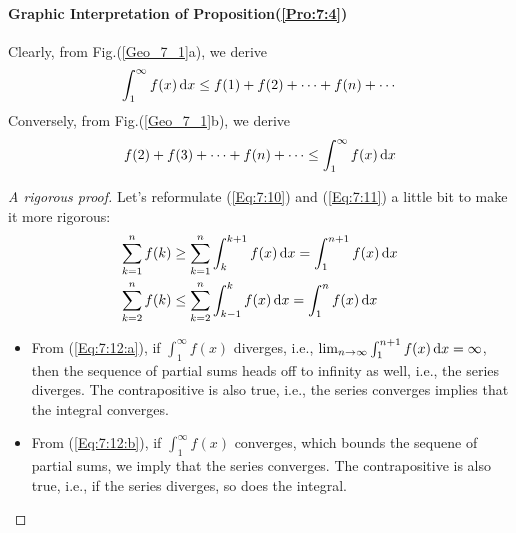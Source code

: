 \paragraph{Graphic Interpretation of Proposition(\ref{Pro:7:4})}
Clearly, from Fig.(\ref{Geo_7_1}a), we derive
\begin{equation}\label{Eq:7:10}
\int_1^\infty f(x)\diff x\le f(1)+f(2)+\cdots+f(n)+\cdots
\end{equation}
Conversely, from Fig.(\ref{Geo_7_1}b), we derive
\begin{equation}\label{Eq:7:11}
f(2)+f(3)+\cdots+f(n)+\cdots\le\int_1^\infty f(x)\diff x
\end{equation}
\begin{proof}[A rigorous proof]
Let's reformulate (\ref{Eq:7:10}) and (\ref{Eq:7:11}) a little bit to make it more rigorous:
\begin{subequations}
\begin{align}
\sum_{k=1}^nf(k)&\ge\sum_{k=1}^n\int_k^{k+1}f(x)\diff x=\int_1^{n+1}f(x)\diff x\label{Eq:7:12:a}\\
\sum_{k=2}^nf(k)&\le \sum_{k=2}^n\int_{k-1}^{k}f(x)\diff x
=
\int_1^nf(x)\diff x\label{Eq:7:12:b}
\end{align}
\end{subequations}
\begin{itemize}
\item
From (\ref{Eq:7:12:a}), if $\int_1^\infty f(x)$ diverges, i.e., $\lim_{n\to\infty}\int_1^{n+1}f(x)\,\mathrm{d} x=\infty$, then the sequence of partial sums heads off to infinity as well, i.e., the series diverges. The contrapositive is also true, i.e., the series converges implies that the integral converges.
\item
From (\ref{Eq:7:12:b}), if $\int_1^\infty f(x)$ converges, which bounds the sequene of partial sums, we imply that the series converges. The contrapositive is also true, i.e., if the series diverges, so does the integral.
\end{itemize}
\end{proof}

